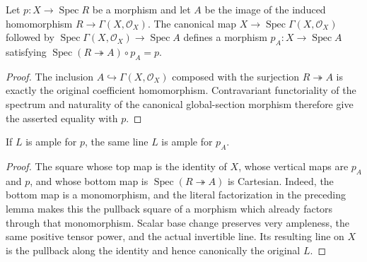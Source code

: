 \begin{lemma}
\label{lem:kn-relative-coefficient-image-factor}
\leanok
Let $p:X\to\operatorname{Spec}R$ be a morphism and let
$A$ be the image of the induced homomorphism
$R\to\Gamma(X,\mathcal O_X)$. The canonical map
$X\to\operatorname{Spec}\Gamma(X,\mathcal O_X)$ followed by
$\operatorname{Spec}\Gamma(X,\mathcal O_X)\to\operatorname{Spec}A$
defines a morphism $p_A:X\to\operatorname{Spec}A$ satisfying
$\operatorname{Spec}(R\twoheadrightarrow A)\circ p_A=p$.
\end{lemma}
\begin{proof}
The inclusion $A\hookrightarrow\Gamma(X,\mathcal O_X)$ composed with
the surjection $R\twoheadrightarrow A$ is exactly the original
coefficient homomorphism. Contravariant functoriality of the spectrum
and naturality of the canonical global-section morphism therefore give
the asserted equality with $p$.
\end{proof}

\begin{lemma}
\label{lem:kn-relative-ample-coefficient-image}
\leanok
{}
If $L$ is ample for $p$, the same line $L$ is ample for $p_A$.
\end{lemma}
\begin{proof}
The square whose top map is the identity of $X$, whose vertical maps
are $p_A$ and $p$, and whose bottom map is
$\operatorname{Spec}(R\twoheadrightarrow A)$ is Cartesian. Indeed,
the bottom map is a monomorphism, and the literal factorization in the
preceding lemma makes this the pullback square of a morphism which
already factors through that monomorphism. Scalar base change preserves
very ampleness, the same positive tensor power, and the actual
invertible line. Its resulting line on $X$ is the pullback along the
identity and hence canonically the original $L$.
\end{proof}

